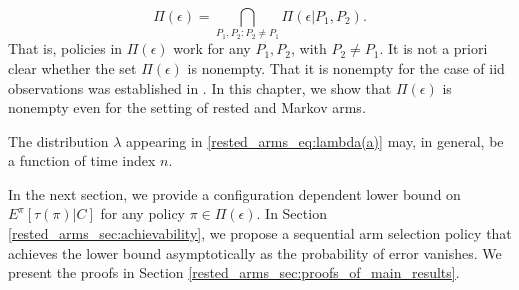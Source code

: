 \begin{remark}
\begin{equation}
\Pi(\epsilon)=\bigcap\limits_{P_1,P_2:P_2\neq P_1} \Pi(\epsilon|P_1,P_2). \label{rested_arms_eq:Pi(epsilon)_as_intersection}
\end{equation}
That is, policies in $\Pi(\epsilon)$ work for any $P_1, P_2$, with $P_2\neq P_1$. It is not a priori clear whether the set $\Pi(\epsilon)$ is nonempty. That it is nonempty for the case of iid observations was established in \cite{Chernoff1959}. In this chapter, we show that $\Pi(\epsilon)$ is nonempty even for the setting of rested and Markov arms.
\end{remark}

\begin{remark}
	The distribution $\lambda$ appearing in \eqref{rested_arms_eq:lambda(a)} may, in general, be a function of time index $n$.
\end{remark}

In the next section, we provide a configuration dependent lower bound on $E^\pi[\tau(\pi)|C]$ for any policy $\pi\in\Pi(\epsilon)$. In Section \ref{rested_arms_sec:achievability}, we propose a sequential arm selection policy that achieves the lower bound asymptotically as the probability of error vanishes. We present the proofs in Section \ref{rested_arms_sec:proofs_of_main_results}.









